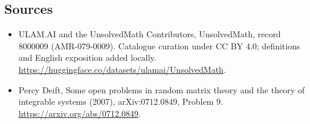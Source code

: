 \documentclass[11pt]{article}
\begin{document}
\subsection{Sources}
\begin{itemize}
\item[\hypertarget{source:8000009:1}{S1}] ULAM.AI and the UnsolvedMath Contributors, UnsolvedMath, record 8000009 (AMR-079-0009). Catalogue curation under CC BY 4.0; definitions and English exposition added locally.
\url{https://huggingface.co/datasets/ulamai/UnsolvedMath}.
\item[\hypertarget{source:8000009:2}{S2}] Percy Deift, Some open problems in random matrix theory and the theory of integrable systems (2007), arXiv:0712.0849, Problem 9.
\url{https://arxiv.org/abs/0712.0849}.
\end{itemize}
\label{end:8000009}
\end{document}
